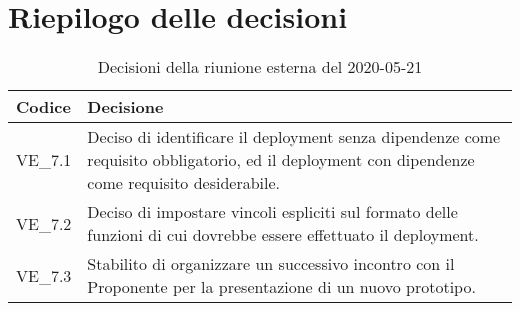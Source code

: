 \section{Riepilogo delle decisioni}
\begin{longtable}{
	 >{\centering}p{} >{}p{} }
	\caption{Decisioni della riunione esterna del 2020-05-21}\\

	\textbf{\color{white}Codice} &
	\textbf{\color{white}Decisione}
	\tabularnewline
	\endhead

	VE\_7.1 & Deciso di identificare il deployment senza dipendenze come requisito obbligatorio, ed il deployment con dipendenze come requisito desiderabile. \\
	VE\_7.2 & Deciso di impostare vincoli espliciti sul formato delle funzioni di cui dovrebbe essere effettuato il deployment. \\
	VE\_7.3 & Stabilito di organizzare un successivo incontro con il Proponente\ped{\textit{G}} per la presentazione di un nuovo prototipo. \\
\end{longtable}
